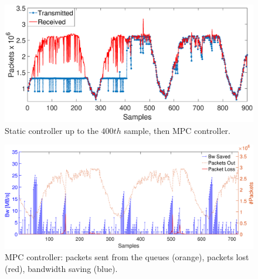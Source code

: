 \begin{figure}[h!]
\centering
\includegraphics[trim={120 0 120 0},width=0.9\linewidth]{figure/MPCfinal.eps}
\caption{Static controller up to the $400th$ sample, then MPC controller.}
\label{fig:{MPC}}
\end{figure}
\begin{figure}[h!]
	\centering
	\includegraphics[trim={120 0 120 0},width=1\linewidth]{figure/Banda.eps}
	\vspace{-0.2cm}
	\caption{MPC controller: packets sent from the queues (orange), packets lost (red), bandwidth saving (blue).}
	\vspace{-0.5cm}
	\label{fig:{BWsave}}
\end{figure}


